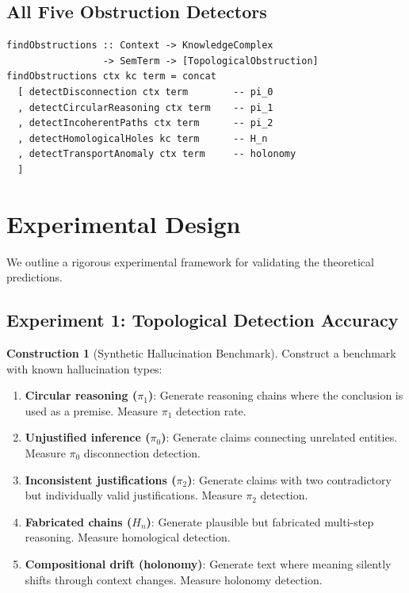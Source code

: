 \documentclass[11pt,a4paper]{article}
\theoremstyle{plain}
\theoremstyle{definition}
\newtheorem{construction}[theorem]{Construction}
\theoremstyle{remark}
\begin{document}
\subsection{All Five Obstruction Detectors}

\begin{lstlisting}[caption={Integrated obstruction detection}]
findObstructions :: Context -> KnowledgeComplex
                 -> SemTerm -> [TopologicalObstruction]
findObstructions ctx kc term = concat
  [ detectDisconnection ctx term        -- pi_0
  , detectCircularReasoning ctx term    -- pi_1
  , detectIncoherentPaths ctx term      -- pi_2
  , detectHomologicalHoles kc term      -- H_n
  , detectTransportAnomaly ctx term     -- holonomy
  ]
\end{lstlisting}


\section{Experimental Design}\label{sec:experiments}

We outline a rigorous experimental framework for validating the theoretical predictions.

\subsection{Experiment 1: Topological Detection Accuracy}

\begin{construction}[Synthetic Hallucination Benchmark]\label{con:benchmark}
Construct a benchmark with known hallucination types:
\begin{enumerate}[nosep]
  \item \textbf{Circular reasoning ($\pi_1$)}: Generate reasoning chains where the conclusion is used as a premise. Measure $\pi_1$ detection rate.
  \item \textbf{Unjustified inference ($\pi_0$)}: Generate claims connecting unrelated entities. Measure $\pi_0$ disconnection detection.
  \item \textbf{Inconsistent justifications ($\pi_2$)}: Generate claims with two contradictory but individually valid justifications. Measure $\pi_2$ detection.
  \item \textbf{Fabricated chains ($H_n$)}: Generate plausible but fabricated multi-step reasoning. Measure homological detection.
  \item \textbf{Compositional drift (holonomy)}: Generate text where meaning silently shifts through context changes. Measure holonomy detection.
\end{enumerate}
\end{construction}
\end{document}
